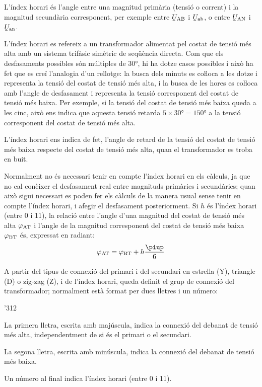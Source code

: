 L'índex horari és l'angle entre una magnitud  primària (tensió o corrent) i la magnitud secundària corresponent, per exemple entre $\cmplx{U}\ped{AB}$ i $\cmplx{U}\ped{ab}$, o entre $\cmplx{U}\ped{AN}$ i $\cmplx{U}\ped{an}$.

L'índex horari es refereix a un transformador alimentat pel costat de tensió més alta  amb un sistema trifàsic simètric de seqüència directa. Com que els desfasaments possibles són múltiples de \ang{30}, hi ha dotze casos possibles i això ha fet que es creï l'analogia d'un rellotge: la busca dels minuts es coŀloca a les dotze i representa la tensió del costat de tensió més alta, i la busca de les hores es coŀloca amb l'angle de desfasament i representa la tensió corresponent del costat de tensió més baixa. Per exemple, si la tensió del costat de tensió més baixa queda a les cinc, això ens indica que aquesta tensió retarda $5\times \ang{30}= \ang{150}$ a la tensió corresponent del costat de tensió més alta.

L'índex horari ens indica de fet, l'angle de retard de la tensió del costat de tensió més baixa respecte del costat de tensió més alta, quan el transformador es troba en buit.

Normalment no és necessari tenir en compte l'índex horari en els càlculs, ja que no cal conèixer el desfasament real entre magnituds primàries i secundàries; quan això sigui necessari es poden fer els càlculs de la manera usual sense tenir en compte l'índex horari, i afegir el desfasament posteriorment. Si $h$ és l'índex horari (entre 0 i 11), la relació entre l'angle d'una magnitud del costat de tensió més alta $\varphi_\mathrm{AT}$ i l'angle de la magnitud corresponent del costat de tensió més baixa $\varphi_\mathrm{BT}$ és, expressat en radiant:
\begin{equation}
    \varphi\ped{AT} = \varphi\ped{BT} + h\frac{\piup}{6}\label{eq:fi-AT-BT}
\end{equation}


A partir del tipus de connexió del primari i del secundari en estrella (Y), triangle (D) o zig-zag (Z), i de l'índex horari, queda definit el grup de connexió del transformador; normalment està format per dues lletres i un número:
\begin{dingautolist}{'312}
   \item La primera lletra, escrita amb majúscula, indica la connexió del debanat de tensió més alta, independentment de si és el primari o el secundari.
   \item La segona lletra, escrita amb minúscula, indica la connexió del debanat de tensió més baixa.
   \item Un número al final indica l'índex horari (entre 0 i 11).
\end{dingautolist}

